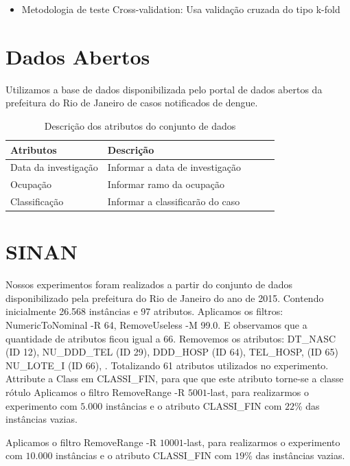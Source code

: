 \documentclass[
	12pt,				%
	openright,			%
	oneside,	
	a4paper,				%
	english,				%
	brazil				%
]{abntex2/abntex2} %
\begin{document}
	\begin{itemize}
		\item Metodologia de teste Cross-validation: Usa validação cruzada do tipo k-fold
	\end{itemize}

	
	\section{Dados Abertos}
	
	Utilizamos a base de dados disponibilizada pelo portal de dados abertos da prefeitura do Rio de Janeiro de casos notificados de dengue.

		\begin{table}[]
			\caption{Descrição dos atributos do conjunto de dados}
			\label{tabelaDescricaoAtributos}
			\centering
			\label{my-label}
			\begin{tabular}{@{}lllll@{}}
				\toprule
				Atributos            & Descrição                        &  &  &  \\ \midrule
				Data da investigação & Informar a data de investigação  &  &  &  \\
				Ocupação             & Informar ramo da ocupação        &  &  &  \\
				Classificação        & Informar a classificarão do caso &  &  &  \\ \bottomrule
			\end{tabular}
		\end{table}
		
		
	\section{SINAN}
	
		Nossos experimentos foram realizados a partir do conjunto de dados disponibilizado pela prefeitura do Rio de Janeiro do ano de 2015. Contendo inicialmente 26.568 instâncias e 97 atributos.
		Aplicamos os filtros: NumericToNominal -R 64, RemoveUseless -M 99.0. E observamos que a quantidade de atributos ficou igual a 66.
		Removemos os atributos: DT_NASC (ID 12), NU_DDD_TEL (ID 29), DDD_HOSP (ID 64), TEL_HOSP, (ID 65) NU_LOTE_I (ID 66), . Totalizando 61 atributos utilizados no experimento.
		Attribute a Class em CLASSI_FIN, para que que este atributo torne-se a classe rótulo
		Aplicamos o filtro RemoveRange -R $5001$-last, para realizarmos o experimento com $5.000$ instâncias e o atributo CLASSI_FIN com $22$\% das instâncias vazias.
		
		Aplicamos o filtro RemoveRange -R $10001$-last, para realizarmos o experimento com $10.000$ instâncias e o atributo CLASSI_FIN com $19$\% das instâncias vazias.
		
\end{document}
